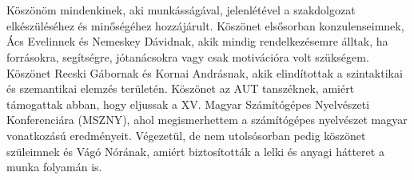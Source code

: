 \chapter*{\koszonetnyilvanitas}

Köszönöm mindenkinek, aki munkásságával, jelenlétével a szakdolgozat elkészüléséhez és minőségéhez hozzájárult. 
Köszönet elsősorban konzulenseimnek, Ács Evelinnek és Nemeskey Dávidnak, akik mindig rendelkezésemre álltak, ha forrásokra, segítségre, jótanácsokra vagy csak motivációra volt szükségem. 
Köszönet Recski Gábornak és Kornai Andrásnak, akik elindítottak a szintaktikai és szemantikai elemzés területén. Köszönet az AUT tanszéknek, amiért támogattak abban, hogy eljussak a XV. Magyar Számítógépes Nyelvészeti Konferenciára (MSZNY), ahol megismerhettem a számítógépes nyelvészet magyar vonatkozású eredményeit. 
Végezetül, de nem utolsósorban pedig köszönet szüleimnek és Vágó Nórának, amiért biztosították a lelki és anyagi hátteret a munka folyamán is.